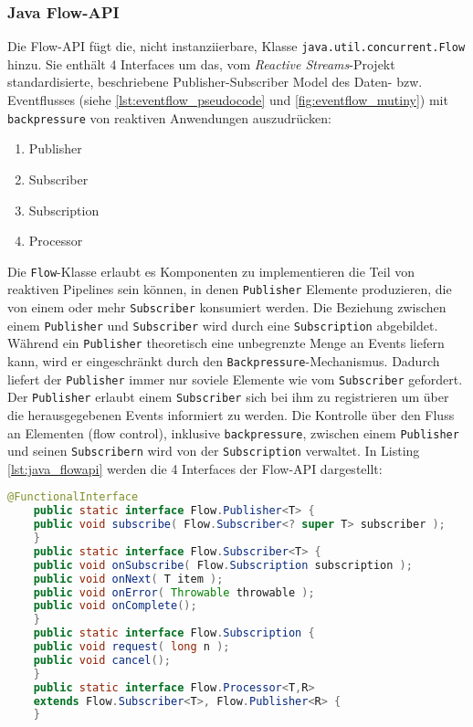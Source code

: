 \subsubsection{Java Flow-API}
\label{section:java_flow_api}

Die Flow-API fügt die, nicht instanziierbare, Klasse \verb|java.util.concurrent.Flow| hinzu. Sie enthält 4 Interfaces um das,
vom \textit{Reactive Streams}-Projekt standardisierte, beschriebene Publisher-Subscriber Model des Daten- bzw. Eventflusses
(siehe \ref{lst:eventflow_pseudocode} und \ref{fig:eventflow_mutiny}) mit \verb|backpressure|
von reaktiven Anwendungen auszudrücken:
\begin{enumerate}
	\item Publisher
	\item Subscriber
	\item Subscription
	\item Processor
\end{enumerate}

Die \verb|Flow|-Klasse erlaubt es Komponenten zu implementieren die Teil von reaktiven Pipelines sein können, in denen
\verb|Publisher| Elemente produzieren, die von einem oder mehr \verb|Subscriber| konsumiert werden. Die Beziehung zwischen einem
\verb|Publisher| und \verb|Subscriber| wird durch eine \verb|Subscription| abgebildet.
Während ein \verb|Publisher| theoretisch eine unbegrenzte Menge an Events liefern kann, wird er eingeschränkt durch den
\verb|Backpressure|-Mechanismus. Dadurch liefert der \verb|Publisher| immer nur soviele Elemente wie vom \verb|Subscriber| gefordert.
Der \verb|Publisher| erlaubt einem \verb|Subscriber| sich bei ihm zu registrieren um über die herausgegebenen Events informiert zu werden.
Die Kontrolle über den Fluss an Elementen (flow control), inklusive \verb|backpressure|, zwischen einem \verb|Publisher| und seinen \verb|Subscribern|
wird von der \verb|Subscription| verwaltet.
In Listing \ref{lst:java_flowapi} werden die 4 Interfaces der Flow-API dargestellt:
\begin{lstlisting}[language=java, caption=Die Klasse java.util.concurrent.Flow, captionpos=b, label=lst:java_flowapi]
	@FunctionalInterface
	public static interface Flow.Publisher<T> {
	public void subscribe( Flow.Subscriber<? super T> subscriber );
	}
	public static interface Flow.Subscriber<T> {
	public void onSubscribe( Flow.Subscription subscription );
	public void onNext( T item );
	public void onError( Throwable throwable );
	public void onComplete();
	}
	public static interface Flow.Subscription {
	public void request( long n );
	public void cancel();
	}
	public static interface Flow.Processor<T,R>
	extends Flow.Subscriber<T>, Flow.Publisher<R> {
	}
\end{lstlisting}\parencite[Kapitel 5.11]{JavaSE9StandardBibliothek}

